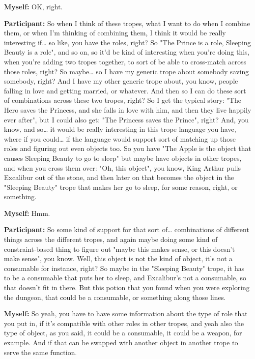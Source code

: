 \documentclass[11pt]{report}
\begin{document}
\begin{linenumbers}
\textbf{Myself:} OK, right.

\textbf{Participant:} So when I think of these tropes, what I want to do when I combine them, or when I'm thinking of combining them, I think it would be really interesting if\ldots{} so like, you have the roles, right? So "The Prince is a role, Sleeping Beauty is a role", and so on, so it'd be kind of interesting when you're doing this, when you're adding two tropes together, to sort of be able to cross-match across those roles, right? So maybe\ldots{} so I have my generic trope about somebody saving somebody, right? And I have my other generic trope about, you know, people falling in love and getting married, or whatever. And then so I can do these sort of combinations across these two tropes, right? So I get the typical story: "The Hero saves the Princess, and she falls in love with him, and then they live happily ever after", but I could also get: "The Princess saves the Prince", right? And, you know, and so\ldots{} it would be really interesting in this trope language you have, where if you could\ldots{} if the language would support sort of matching up those roles and figuring out even objects too. So you have "The Apple is the object that causes Sleeping Beauty to go to sleep" but maybe have objects in other tropes, and when you cross them over: "Oh, this object", you know, King Arthur pulls Excalibur out of the stone, and then later on that becomes the object in the "Sleeping Beauty" trope that makes her go to sleep, for some reason, right, or something.

\textbf{Myself:} Hmm.

\textbf{Participant:} So some kind of support for that sort of\ldots{} combinations of different things across the different tropes, and again maybe doing some kind of constraint-based thing to figure out "maybe this makes sense, or this doesn't make sense", you know. Well, this object is not the kind of object, it's not a consumable for instance, right? So maybe in the "Sleeping Beauty" trope, it has to be a consumable that puts her to sleep, and Excalibur's not a consumable, so that doesn't fit in there. But this potion that you found when you were exploring the dungeon, that could be a consumable, or something along those lines.

\textbf{Myself:} So yeah, you have to have some information about the type of role that you put in, if it's compatible with other roles in other tropes, and yeah also the type of object, as you said, it could be a consumable, it could be a weapon, for example. And if that can be swapped with another object in another trope to serve the same function.


\end{linenumbers}
\end{document}
